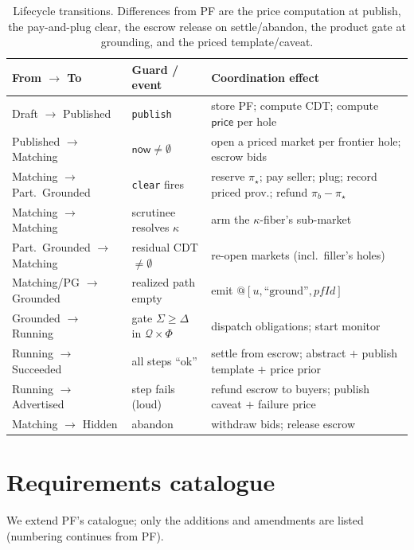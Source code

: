 \documentclass[11pt]{article}
\theoremstyle{definition}
\newcommand{\PF}{\textsf{PF}}
\newcommand{\CDT}{\textsf{CDT}}
\newcommand{\price}{\ensuremath{\mathsf{price}}}
\newcommand{\Qval}{\mathcal{Q}}            %
\newcommand{\Phl}{\Phi}                     %
\newcommand{\now}{\textsf{now}}
\begin{document}
\begin{table}[h]
\centering\small
\begin{tabular}{@{}lll@{}}
\toprule
From $\to$ To & Guard / event & Coordination effect \\
\midrule
Draft $\to$ Published & \texttt{publish} & store \PF{}; compute \CDT{}; compute $\price$ per hole \\
Published $\to$ Matching & $\now\neq\emptyset$ & open a priced market per frontier hole; escrow bids \\
Matching $\to$ Part.\ Grounded & \texttt{clear} fires & reserve $\pi_\star$; pay seller; plug; record priced prov.; refund $\pi_b-\pi_\star$ \\
Matching $\to$ Matching & scrutinee resolves $\kappa$ & arm the $\kappa$-fiber's sub-market \\
Part.\ Grounded $\to$ Matching & residual \CDT{} $\neq\emptyset$ & re-open markets (incl.\ filler's holes) \\
Matching/PG $\to$ Grounded & realized path empty & emit $@[u,\text{``ground''},pfId]$ \\
Grounded $\to$ Running & gate $\Sigma\ge\Delta$ in $\Qval\times\Phl$ & dispatch obligations; start monitor \\
Running $\to$ Succeeded & all steps ``ok'' & settle from escrow; abstract $+$ publish template $+$ price prior \\
Running $\to$ Advertised & step fails (loud) & refund escrow to buyers; publish caveat $+$ failure price \\
Matching $\to$ Hidden & abandon & withdraw bids; release escrow \\
\bottomrule
\end{tabular}
\caption{Lifecycle transitions. Differences from \PF{} are the price computation at publish, the
pay-and-plug clear, the escrow release on settle/abandon, the product gate at grounding, and the
priced template/caveat.}
\label{tab:transitions}
\end{table}

\section{Requirements catalogue}\label{sec:reqs}
We extend \PF{}'s catalogue; only the additions and amendments are listed (numbering continues from
\PF{}).
\end{document}
